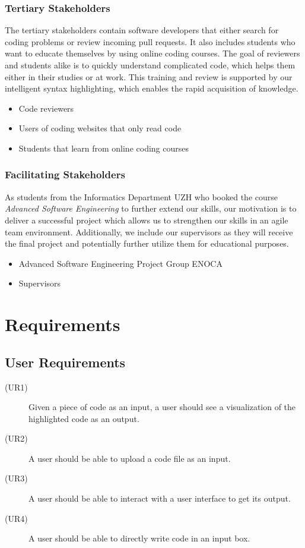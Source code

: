 \documentclass[11pt]{article}
\begin{document}
\subsubsection*{Tertiary Stakeholders}
The tertiary stakeholders contain software developers that either search for coding problems or review incoming pull requests. It also includes students who want to educate themselves by using online coding courses. The goal of reviewers and students alike is to quickly understand complicated code, which helps them either in their studies or at work. This training and review is supported by our intelligent syntax highlighting, which enables the rapid acquisition of knowledge.
\begin{itemize}
\item Code reviewers
\item Users of coding websites that only read code
\item Students that learn from online coding courses
\end{itemize}

\subsubsection*{Facilitating Stakeholders}
As students from the Informatics Department UZH who booked the course \textit{Advanced Software Engineering} to further extend our skills, our motivation is to deliver a successful project which allows us to strengthen our skills in an agile team environment. Additionally, we include our supervisors as they will receive the final project and potentially further utilize them for educational purposes.
\begin{itemize}
\item Advanced Software Engineering Project Group ENOCA
\item Supervisors
\end{itemize}

\section{Requirements}

\subsection{User Requirements}
\begin{description}
\item[(UR1)] Given a piece of code as an input, a user should see a visualization of the highlighted code as an output.
\item[(UR2)] A user should be able to upload a code file as an input.
\item[(UR3)] A user should be able to interact with a user interface to get its output.
\item[(UR4)] A user should be able to directly write code in an input box. 
\end{description}
\end{document}
